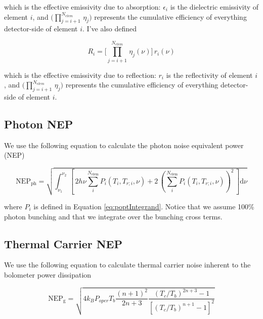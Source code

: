 \documentclass[12pt, titlepage]{article} %
\begin{document}
which is the effective emissivity due to absorption: $\epsilon_{i}$ is the dielectric emissivity of element $i$, and $\Big( \prod_{j = i+1}^{N_{elem}} \, \eta_{j} \Big)$ represents the cumulative efficiency of everything detector-side of element $i$. I've also defined 

\begin{equation}
	R_{i} = \Big[ \prod_{j = i+1}^{N_{elem}} \, \eta_{j} (\nu) \Big] \, r_{i} (\nu)
	\label{eq:reflEffEmiss}
\end{equation}

which is the effective emissivity due to reflection: $r_{i}$ is the reflectivity of element $i$, and $\Big( \prod_{j = i+1}^{N_{elem}} \, \eta_{j} \Big)$ represents the cumulative efficiency of everything detector-side of element $i$.


\subsection{Photon NEP}

We use the following equation to calculate the photon noise equivalent power (NEP) \cite{kamThesis}

\begin{equation}
	\mathrm{NEP_{ph}} = \sqrt{\int_{\nu_{1}}^{\nu_{2}} \, [ \, 2 h \nu \sum_{i}^{N_\mathrm{elem}}  P_{i} (T_{i}, T_{r;i}, \nu) + 2 \, (\sum_{i}^{N_\mathrm{elem}}  P_{i} (T_{i}, T_{r;i}, \nu))^{2} \, ] \mathrm{d}\nu}
\end{equation}


where $P_{i}$ is defined in Equation \ref{eq:poptIntegrand}. Notice that we assume 100\% photon bunching and that we integrate over the bunching cross terms.


\subsection{Thermal Carrier NEP}

We use the following equation to calculate thermal carrier noise inherent to the bolometer power dissipation \cite{tokiThesis}

\begin{equation}
	\mathrm{NEP_{g}} = \sqrt{4 k_{B} P_{oper} T_{b} \frac{(n+1)^{2}}{2n + 3} \frac{(T_{c} / T_{b})^{2n + 3} - 1}{[(T_{c} / T_{b})^{n+1} - 1]^{2}}}
\end{equation}
\end{document}
